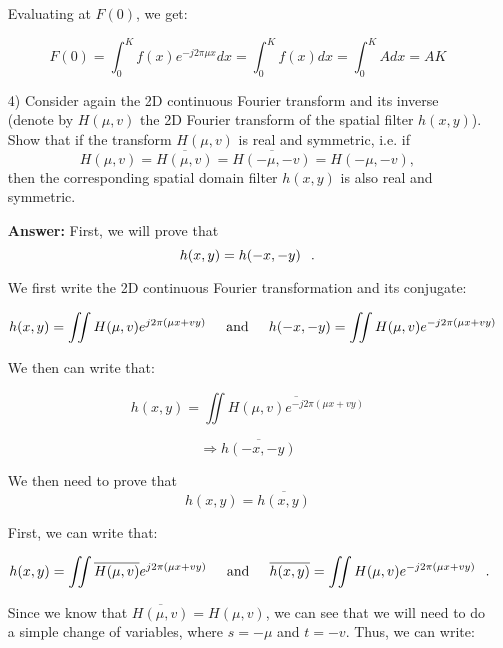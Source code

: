 \documentclass{article}
\begin{document}
\begin{enumerate}
Evaluating at $F(0)$, we get:

\begin{equation}
F(0) = \int_{0}^{K} f(x) e^{-j2 \pi \mu x}dx = \int_{0}^{K} f(x) dx = \int_{0}^{K} A dx = AK
\end{equation}

\item[4)] Consider again the 2D continuous Fourier transform and its inverse (denote by $H(\mu,v)$ the 2D Fourier transform of the spatial filter $h(x,y)$). 
Show that if the transform $H(\mu ,v)$ is real and symmetric, 
i.e. if 
$$H(\mu ,v)=\overline{H(\mu ,v)}=\overline{H(-\mu,-v)}=H(-\mu,-v),$$ 
then the corresponding spatial domain filter $h(x,y)$ is also real and symmetric. 

\textbf{Answer:} First, we will prove that $$h(x,y) = h(-x,-y) \hspace{0.1in} .$$

We first write the 2D continuous Fourier transformation and its conjugate:

\begin{equation}
h(x,y) = \iint H( \mu, v) e^{j2 \pi (\mu x + vy)} \hspace{0.2in} \text{and} \hspace{0.2in} h(-x, -y) = \iint H(\mu, v) e^{-j2 \pi (\mu x + vy)}
\end{equation}

We then can write that:

\begin{equation}
h(x,y) = \iint \overline{H(\mu , v) e^{-j2 \pi (\mu x + vy)}}
\end{equation}

\begin{equation}
\Rightarrow \overline{h(-x, -y)}
\end{equation}

We then need to prove that 
$$ h(x,y) = \overline{h(x,y)}$$

First, we can write that:

\begin{equation}
h(x,y) = \iint \overline{H(\mu, v)}e^{j2 \pi (\mu x + vy)} \hspace{0.2in} \text{and} \hspace{0.2in} \overline{h(x,y)} = \iint H(\mu, v) e^{-j2 \pi (\mu x + vy)} \hspace{0.1in} .
\end{equation}

Since we know that $\overline{H(\mu , v)} = H(\mu, v)$, we can see that we will need to do a simple change of variables, where $s = -\mu$ and $t = -v$.  Thus, we can write:


\end{enumerate}
\end{document}
